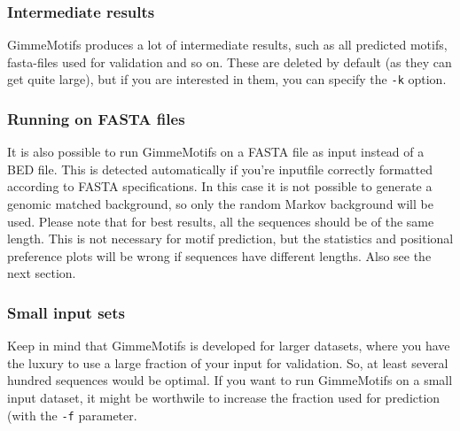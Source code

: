 \documentclass[11pt]{article}
\begin{document}
\subsubsection{Intermediate results}
GimmeMotifs produces a lot of intermediate results, such as all predicted motifs, fasta-files used for validation and so on. These are deleted by default (as they can get quite large), but if you are interested in them, you can specify the \texttt{-k} option.

\subsubsection{Running on FASTA files}
It is also possible to run GimmeMotifs on a FASTA file as input instead of a BED file. This is detected automatically if you're inputfile correctly formatted according to FASTA specifications. In this case it is not possible to generate a genomic matched background, so only the random Markov background will be used. Please note that for best results, all the sequences should be of the same length. This is not necessary for motif prediction, but the statistics and positional preference plots will be wrong if sequences have different lengths. Also see the next section.

\subsubsection{Small input sets}
Keep in mind that GimmeMotifs is developed for larger datasets, where you have the luxury to use a large fraction of your input for validation. So, at least several hundred sequences would be optimal. If you want to run GimmeMotifs on a small input dataset, it might be worthwile to increase the fraction used for prediction (with the \texttt{-f} parameter.
\end{document}
